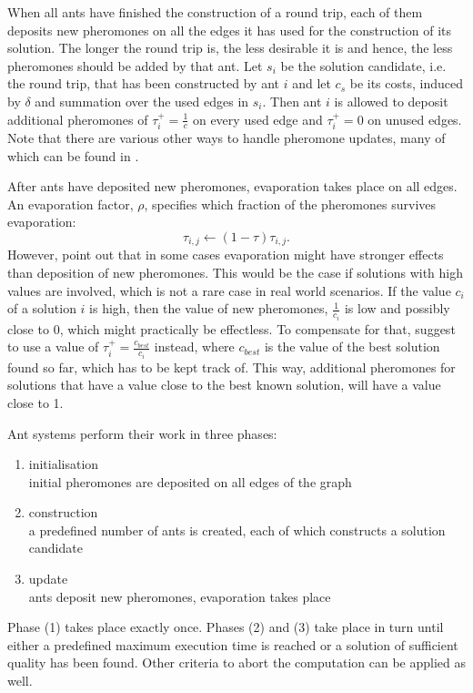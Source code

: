 When all ants have finished the construction of a round trip, each of them deposits new pheromones on all the edges it has used for the construction of its solution. The longer the round trip is, the less desirable it is and hence, the less pheromones should be added by that ant. Let $s_i$ be the solution candidate, i.e. the round trip, that has been constructed by ant $i$ and let $c_s$ be its costs, induced by $\delta$ and summation over the used edges in $s_i$. Then ant $i$ is allowed to deposit additional pheromones of $\tau_i^+ = \frac{1}{c}$ on every used edge and $\tau_i^+ = 0$ on unused edges. Note that there are various other ways to handle pheromone updates, many of which can be found in \cite{Dorigo:2004:ACO:975277}.

After ants have deposited new pheromones, evaporation takes place on all edges. An evaporation factor, $\rho$, specifies which fraction of the pheromones survives evaporation:
\begin{equation}
  \label{eqn:evaporation}
  \tau_{i,j} \leftarrow \left( 1 - \tau \right) \tau_{i,j}.
\end{equation}
However, \cite{Bloecker} point out that in some cases evaporation might have stronger effects than deposition of new pheromones. This would be the case if solutions with high values are involved, which is not a rare case in real world scenarios. If the value $c_i$ of a solution $i$ is high, then the value of new pheromones, $\frac{1}{c_i}$ is low and possibly close to $0$, which might practically be effectless. To compensate for that, \cite{Bloecker} suggest to use a value of $\tau_i^+ = \frac{c_{best}}{c_i}$ instead, where $c_{best}$ is the value of the best solution found so far, which has to be kept track of. This way, additional pheromones for solutions that have a value close to the best known solution, will have a value close to 1.

Ant systems perform their work in three phases:
\begin{enumerate}
  \item initialisation \\
    initial pheromones are deposited on all edges of the graph
  \item construction \\
    a predefined number of ants is created, each of which constructs a solution candidate
  \item update \\
    ants deposit new pheromones, evaporation takes place
\end{enumerate}
Phase (1) takes place exactly once. Phases (2) and (3) take place in turn until either a predefined maximum execution time is reached or a solution of sufficient quality has been found. Other criteria to abort the computation can be applied as well.

